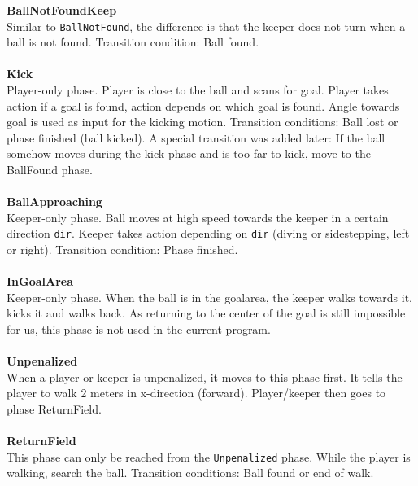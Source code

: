 \documentclass[a4paper]{article}
\begin{document}
\textbf{BallNotFoundKeep}\\
Similar to \texttt{BallNotFound}, the difference is that the keeper does not turn when a ball is not found. Transition condition: Ball found.\\\\
\textbf{Kick}\\
Player-only phase. Player is close to the ball and scans for goal. Player takes action if a goal is found, action depends on which goal is found. Angle towards goal is used as input for the kicking motion. Transition conditions: Ball lost or phase finished (ball kicked). A special transition was added later: If the ball somehow moves during the kick phase and is too far to kick, move to the BallFound phase.\\\\
\textbf{BallApproaching}\\
Keeper-only phase. Ball moves at high speed towards the keeper in a certain direction \texttt{dir}. Keeper takes action depending on \texttt{dir} (diving or sidestepping, left or right). Transition condition: Phase finished. \\\\
\textbf{InGoalArea}\\
Keeper-only phase. When the ball is in the goalarea, the keeper walks towards it, kicks it and walks back. As returning to the center of the goal is still impossible for us, this phase is not used in the current program.\\\\
\textbf{Unpenalized}\\
When a player or keeper is unpenalized, it moves to this phase first. It tells the player to walk 2 meters in x-direction (forward). Player/keeper then goes to phase ReturnField.\\\\
\textbf{ReturnField}\\
This phase can only be reached from the \texttt{Unpenalized} phase. While the player is walking, search the ball. Transition conditions: Ball found or end of walk.\\
\end{document}
